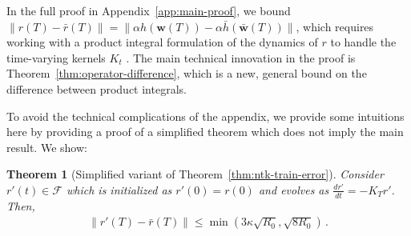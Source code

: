 \documentclass[11pt]{article} %
\newcommand{\<}{\langle}
\renewcommand{\>}{\rangle}
\def\bw{{\boldsymbol w}}
\def\cF{{\mathcal F}}
\def\cF{{\mathcal F}}
\def\barbw{\bar{\bw}}
\theoremstyle{plain}
\newtheorem{theorem}{Theorem}[section]
\theoremstyle{definition}
\theoremstyle{remark}
\begin{document}
In the full proof in Appendix~\ref{app:main-proof}, we bound $\|r(T) - \bar{r}(T)\| = \|\alpha h(\bw(T)) - \alpha\bar{h}(\barbw(T))\|$, which requires working with a product integral formulation of the dynamics of $r$ to handle the time-varying kernels $K_t$ \citep{dollard_friedman_1984}. The main technical innovation  in the proof is Theorem~\ref{thm:operator-difference}, which is a new, general bound on the difference between product integrals.

To avoid the technical complications of the appendix, we provide some intuitions here by providing a proof of a simplified theorem 
which does not imply the main result. We show:
\begin{theorem}[Simplified variant of Theorem~\ref{thm:ntk-train-error}]\label{thm:simplified}
Consider $r'(t) \in \cF$ which is initialized as $r'(0) = r(0)$ and evolves as 
$\frac{dr'}{dt} = -K_T r'$. Then,
\begin{align}\label{eq:intuition-final-bound}
\|r'(T) - \bar{r}(T)\| \leq \min(3\kappa\sqrt{R_0}, \sqrt{8R_0})\,.
\end{align}
\end{theorem}
\end{document}
